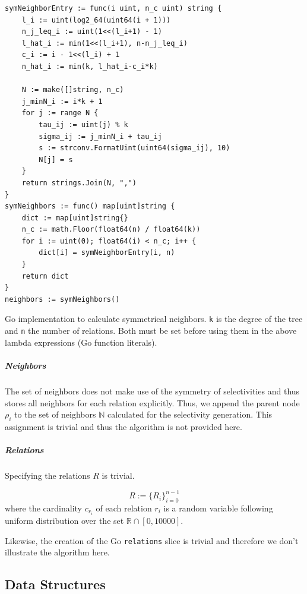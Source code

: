 \begin{algorithm}[H]
\begin{verbatim}
symNeighborEntry := func(i uint, n_c uint) string {
    l_i := uint(log2_64(uint64(i + 1)))
    n_j_leq_i := uint(1<<(l_i+1) - 1)
    l_hat_i := min(1<<(l_i+1), n-n_j_leq_i)
    c_i := i - 1<<(l_i) + 1
    n_hat_i := min(k, l_hat_i-c_i*k)

    N := make([]string, n_c)
    j_minN_i := i*k + 1
    for j := range N {
        tau_ij := uint(j) % k
        sigma_ij := j_minN_i + tau_ij
        s := strconv.FormatUint(uint64(sigma_ij), 10)
        N[j] = s
    }
    return strings.Join(N, ",")
}
symNeighbors := func() map[uint]string {
    dict := map[uint]string{}
    n_c := math.Floor(float64(n) / float64(k))
    for i := uint(0); float64(i) < n_c; i++ {
        dict[i] = symNeighborEntry(i, n)
    }
    return dict
}
neighbors := symNeighbors()
\end{verbatim}
\caption[Go implementation to calculate symmetrical neighbors]{Go implementation to calculate symmetrical neighbors. \texttt{k} is the degree of the tree and \texttt{n} the number of relations. Both must be set before using them in the above lambda expressions (Go function literals).}
\label{alg:symNeighbors}
\end{algorithm}

\subparagraph{Neighbors}
The set of neighbors does not make use of the symmetry of selectivities and thus stores all neighbors for each relation explicitly. Thus, we append the parent node $\rho_i$ to the set of neighbors $\mathbb{N}$ calculated for the selectivity generation. This assignment is trivial and thus the algorithm is not provided here.

\subparagraph{Relations}
Specifying the relations $R$ is trivial. 

\begin{equation}
R := \{R_i\}_{i=0}^{n-1}
\end{equation}
where the cardinality $c_{r_i}$ of each relation $r_i$ is a random variable following uniform distribution over the set $\mathbb{R} \cap [0,10000]$.

Likewise, the creation of the Go \texttt{relations} slice is trivial and therefore we don't illustrate the algorithm here.

\subsection{Data Structures}
\label{sub:data-structures}

